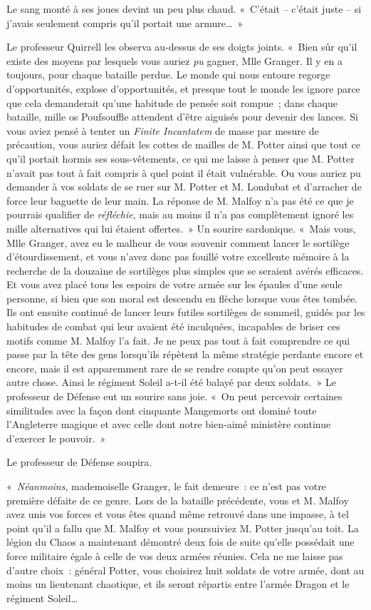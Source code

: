 Le sang monté à ses joues devint un peu plus chaud.
«~C'était -- c'était juste -- si j'avais seulement compris qu'il portait une armure…~»

Le professeur Quirrell les observa au-dessus de ses doigts joints.
«~Bien sûr qu'il existe des moyens par lesquels vous auriez \emph{pu} gagner, Mlle Granger.
Il y en a toujours, pour chaque bataille perdue.
Le monde qui nous entoure regorge d'opportunités, explose d'opportunités, et presque tout le monde les ignore parce que cela demanderait qu'une habitude de pensée soit rompue~; dans chaque bataille, mille os Poufsouffle attendent d'être aiguisés pour devenir des lances.
Si vous aviez pensé à tenter un \emph{Finite Incantatem} de masse par mesure de précaution, vous auriez défait les cottes de mailles de M. Potter ainsi que tout ce qu'il portait hormis ses sous-vêtements, ce qui me laisse à penser que M. Potter n'avait pas tout à fait compris à quel point il était vulnérable.
Ou vous auriez pu demander à vos soldats de se ruer sur M. Potter et M. Londubat et d'arracher de force leur baguette de leur main.
La réponse de M. Malfoy n'a pas été ce que je pourrais qualifier de \emph{réfléchie}, mais au moins il n'a pas complètement ignoré les mille alternatives qui lui étaient offertes.~»
Un sourire sardonique.
«~Mais vous, Mlle Granger, avez eu le malheur de vous souvenir comment lancer le sortilège d'étourdissement, et vous n'avez donc pas fouillé votre excellente mémoire à la recherche de la douzaine de sortilèges plus simples que se seraient avérés efficaces.
Et vous avez placé tous les espoirs de votre armée sur les épaules d'une seule personne, si bien que son moral est descendu en flèche lorsque vous êtes tombée.
Ils ont ensuite continué de lancer leurs futiles sortilèges de sommeil, guidés par les habitudes de combat qui leur avaient été inculquées, incapables de briser ces motifs comme M. Malfoy l'a fait.
Je ne peux pas tout à fait comprendre ce qui passe par la tête des gens lorsqu'ils répètent la même stratégie perdante encore et encore, mais il est apparemment rare de se rendre compte qu'on peut essayer autre chose.
Ainsi le régiment Soleil a-t-il été balayé par deux soldats.~»
Le professeur de Défense eut un sourire sans joie.
«~On peut percevoir certaines similitudes avec la façon dont cinquante Mangemorts ont dominé toute l'Angleterre magique et avec celle dont notre bien-aimé ministère continue d'exercer le pouvoir.~»

Le professeur de Défense soupira.

«~\emph{Néanmoins}, mademoiselle Granger, le fait demeure~: ce n'est pas votre première défaite de ce genre.
Lors de la bataille précédente, vous et M. Malfoy avez unis vos forces et vous êtes quand même retrouvé dans une impasse, à tel point qu'il a fallu que M. Malfoy et vous poursuiviez M. Potter jusqu'au toit.
La légion du Chaos a maintenant démontré deux fois de suite qu'elle possédait une force militaire égale à celle de vos deux armées réunies.
Cela ne me laisse pas d'autre choix~: général Potter, vous choisirez huit soldats de votre armée, dont au moins un lieutenant chaotique, et ils seront répartis entre l'armée Dragon et le régiment Soleil…

